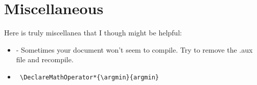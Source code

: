 \documentclass{article}
\begin{document}
\section{Miscellaneous}
Here is truly miscellanea that I though might be helpful:
\begin{itemize}
\item- Sometimes your document won't seem to compile.  Try to remove the .aux file and recompile.
\item \begin{verbatim} \DeclareMathOperator*{\argmin}{argmin} \end{verbatim}
\end{itemize}
\end{document}
